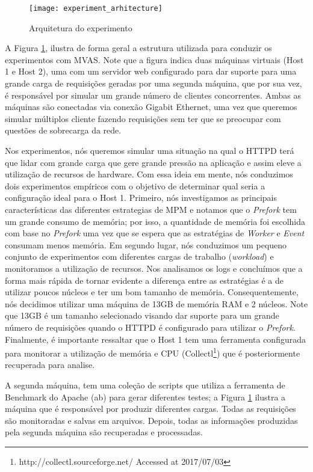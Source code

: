 \begin{figure}[!h] \centering
\texttt{[image: experiment\_arhitecture]}
\caption{Arquitetura do experimento} \label{fig:experiment_architecture}
\end{figure}

A Figura  \ref{fig:experiment_architecture}, ilustra de forma geral a estrutura
utilizada para conduzir os experimentos com MVAS. Note que a figura indica duas
máquinas virtuais (Host 1 e Host 2), uma com um servidor web configurado para
dar suporte para uma grande carga de requisições geradas por uma segunda
máquina, que por sua vez, é responsável por simular um grande número de
clientes concorrentes. Ambas as máquinas são conectadas via conexão Gigabit
Ethernet, uma vez que queremos simular múltiplos cliente fazendo requisições
sem ter que se preocupar com questões de sobrecarga da rede.

Nos experimentos, nós queremos simular uma situação na qual o HTTPD terá que
lidar com grande carga que gere grande pressão na aplicação e assim eleve a
utilização de recursos de hardware. Com essa ideia em mente, nós conduzimos
dois experimentos empíricos com o objetivo de determinar qual seria a
configuração ideal para o Host 1. Primeiro, nós investigamos as principais
características das diferentes estrategias de MPM e notamos que o
\emph{Prefork} tem um grande consumo de memória; por isso, a quantidade de
memória foi escolhida com base no \emph{Prefork} uma vez que se espera que as
estratégias de \emph{Worker} e \emph{Event} consumam menos memória. Em segundo
lugar, nós conduzimos um pequeno conjunto de experimentos com diferentes cargas
de trabalho (\emph{workload}) e monitoramos a utilização de recursos. Nos
analisamos os logs e concluímos que a forma mais rápida de tornar evidente a
diferença entre as estratégias é a de utilizar poucos núcleos e ter um bom
tamanho de memória. Consequentemente, nós decidimos utilizar uma máquina de
13GB de memória RAM e 2 núcleos. Note que 13GB é um tamanho selecionado visando
dar suporte para um grande número de requisições quando o HTTPD é configurado
para utilizar o \emph{Prefork}. Finalmente, é importante ressaltar que o Host 1
tem uma ferramenta configurada para monitorar a utilização de memória e CPU
(Collectl\footnote{http://collectl.sourceforge.net/ Accessed at 2017/07/03})
que é posteriormente recuperada para analise.

A segunda máquina, tem uma coleção de scripts que utiliza a ferramenta de
Benchmark do Apache (ab) para gerar diferentes testes; a Figura
\ref{fig:experiment_architecture} ilustra a máquina que é responsável por
produzir diferentes cargas. Todas as requisições são monitoradas e salvas em
arquivos. Depois, todas as informações produzidas pela segunda máquina são
recuperadas e processadas.

